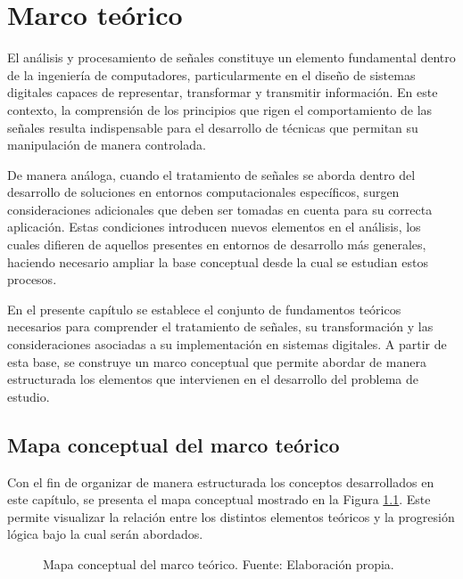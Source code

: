 \chapter{Marco teórico}
\label{ch:marco}

El análisis y procesamiento de señales constituye un elemento fundamental dentro de la ingeniería de computadores, particularmente en el diseño de sistemas digitales capaces de representar, transformar y transmitir información. En este contexto, la comprensión de los principios que rigen el comportamiento de las señales resulta indispensable para el desarrollo de técnicas que permitan su manipulación de manera controlada.

De manera análoga, cuando el tratamiento de señales se aborda dentro del desarrollo de soluciones en entornos computacionales específicos, surgen consideraciones adicionales que deben ser tomadas en cuenta para su correcta aplicación. Estas condiciones introducen nuevos elementos en el análisis, los cuales difieren de aquellos presentes en entornos de desarrollo más generales, haciendo necesario ampliar la base conceptual desde la cual se estudian estos procesos.

En el presente capítulo se establece el conjunto de fundamentos teóricos necesarios para comprender el tratamiento de señales, su transformación y las consideraciones asociadas a su implementación en sistemas digitales. A partir de esta base, se construye un marco conceptual que permite abordar de manera estructurada los elementos que intervienen en el desarrollo del problema de estudio.

\section{Mapa conceptual del marco teórico}

Con el fin de organizar de manera estructurada los conceptos desarrollados en este capítulo, se presenta el mapa conceptual mostrado en la Figura \ref{fig:mapa_conceptual}. Este permite visualizar la relación entre los distintos elementos teóricos y la progresión lógica bajo la cual serán abordados.

\begin{figure}[H]
\centering
\resizebox{\textwidth}{!}{
    \shorthandoff{<>}
    
    \shorthandon{<>}
}
\caption{Mapa conceptual del marco teórico. Fuente: Elaboración propia.}
\label{fig:mapa_conceptual}
\end{figure}


